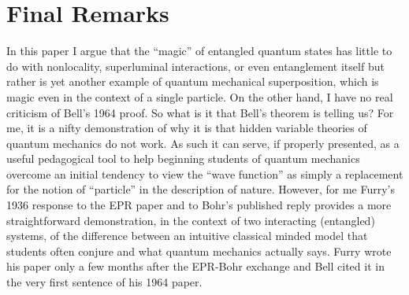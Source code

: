 \documentclass[12pt]{article}
\begin{document}
\section{Final Remarks} \label{FR}

In this paper I argue that the ``magic'' of entangled quantum states has little to do with nonlocality, superluminal interactions, or even entanglement itself but rather is yet another example of quantum mechanical superposition, which is magic even in the context of a single particle.  On the other hand, I have no real criticism of Bell's 1964 proof.  So what is it that Bell's theorem is telling us?  For me, it is a nifty demonstration of why it is that hidden variable theories of quantum mechanics do not work. As such it can serve, if properly presented, as a useful pedagogical tool to help beginning students of quantum mechanics overcome an initial tendency to view the ``wave function'' as simply a replacement for the notion of ``particle'' in the description of nature.  However, for me Furry's 1936 response to the EPR paper and to Bohr's published reply provides a more straightforward demonstration, in the context of two interacting (entangled) systems, of the difference between an intuitive classical minded model that students often conjure and what quantum mechanics actually says.  Furry wrote his paper only a few months after the EPR-Bohr exchange and Bell cited it in the very first sentence of his 1964 paper.
\end{document}
